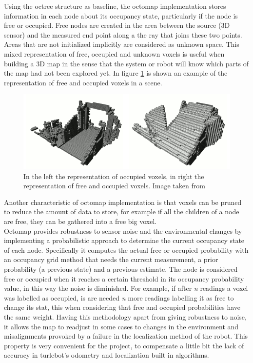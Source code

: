 \documentclass[fontsize=12pt]{article}
\begin{document}
Using the octree structure as baseline, the octomap implementation stores information in each node about its occupancy state, particularly if the node is free or occupied. Free nodes are created in the area between the  source (3D sensor) and the measured end point along a the ray that joins these two points. Areas that are not initialized implicitly are considered as unknown space. This mixed representation of free, occupied and unknown voxels is useful when building a 3D map in the sense  that the system or robot will know which parts of the map had not been explored yet. In figure \ref{fig:octreefree} is shown an example of the representation of free and occupied voxels in a scene. 
\begin{figure}[H]
\begin{center}
\includegraphics[width=0.8\linewidth]{images/octofree}
\caption{In the left the representation of occupied voxels, in right the representation of free and occupied voxels. Image taken from \cite{bib:octomap}}
\label{fig:octreefree}
\end{center}
\end{figure}
Another characteristic of octomap implementation is that voxels can be pruned to reduce the amount of data to store, for example if all the children of a node are free, they can be gathered into a free big voxel. \\
Octomap provides robustness to sensor noise and the environmental changes by implementing a probabilistic approach to determine the current occupancy state of each node. Specifically it computes the actual free or occupied probability with an occupancy grid method that needs the current measurement, a prior probability (a previous state) and a previous estimate. The node is considered free or occupied when it reaches a certain threshold in its occupancy probability value, in this way the noise is diminished. For example, if after \textit{n} readings a voxel was labelled as occupied, is are needed \textit{n} more readings labelling it as free to change its stat, this when considering that free and occupied probabilities  have the same weight. Having this methodology apart from giving robustness to noise, it allows the map to readjust in some cases to changes in the environment and  misalignments provoked by a failure in the localization method of the robot. This property is very convenient for the project, to compensate a little bit the lack of accuracy in turlebot's odometry and localization built in algorithms.
\end{document}
